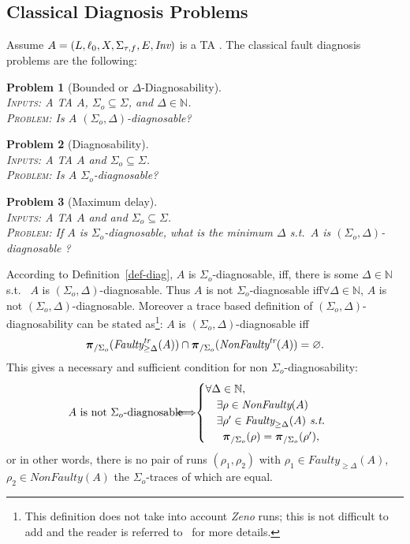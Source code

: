 \documentclass[letterpaper,10pt,conference]{ieeeconf}  \IEEEoverridecommandlockouts                              \overrideIEEEmargins
\def\st{{s.t.}~}
\def\emptyset{\varnothing}
\def\trace{\textit{tr}}
\def\faulty{\textit{Faulty}}
\def\nonfaulty{\textit{NonFaulty}}
\newtheorem{prob}{Problem}  \newtheorem{definition}{Definition}
\newcommand{\setN}{\mathbb N}
\def\ssi{iff\xspace}
\def\tauac{\tau}
\begin{document}
\subsection{Classical Diagnosis Problems}
\noindent
Assume $A=(L,\ell_0,X,\Sigma_{\tauac,f},E,\inv)$ is a TA
.  The
classical fault diagnosis problems are the following: \begin{prob}[Bounded or $\Delta$-Diagnosability] \label{prob-delta-diag} \mbox{} \\
  \textsc{Inputs:} A  TA $A$, $\Sigma_o \subseteq \Sigma$, and $\Delta \in \setN$. \\
  \textsc{Problem:} Is $A$ $(\Sigma_o,\Delta)$-diagnosable?
\end{prob}
\begin{prob}[Diagnosability] \label{prob-diag} \mbox{} \\
  \textsc{Inputs:} A TA $A$ and $\Sigma_o \subseteq \Sigma$. \\
  \textsc{Problem:} Is $A$ $\Sigma_o$-diagnosable?
\end{prob}
\begin{prob}[Maximum delay] \label{prob-delay} \mbox{} \\
  \textsc{Inputs:} A TA $A$ and and $\Sigma_o \subseteq \Sigma$. \\
  \textsc{Problem:} If $A$ is $\Sigma_o$-diagnosable, what is the
  minimum $\Delta$ \st $A$ is $(\Sigma_o,\Delta)$-diagnosable ?
\end{prob}
\smallskip



According to Definition~\ref{def-diag}, $A$
is $\Sigma_o$-diagnosable, \ssi, there is some $\Delta \in \setN$ \st
$A$ is $(\Sigma_o,\Delta)$-diagnosable. Thus $A$ is not $\Sigma_o$-diagnosable
\ssi $\forall \Delta \in \setN$, $A$ is not  $(\Sigma_o,\Delta)$-diagnosable.
Moreover a trace based definition of
$(\Sigma_o,\Delta)$-diagnosability can be stated as\footnote{This
  definition does not take into account \emph{Zeno} runs; this is not
  difficult to add and the reader is referred to~\cite{cassez-cdc-09}
  for more details.}: $A$ is $(\Sigma_o,\Delta)$-diagnosable \ssi
\begin{equation}
  \proj{\Sigma_o}(\faulty_{\geq \Delta}^{\trace}(A)) \cap
  \proj{\Sigma_o}(\nonfaulty^{\trace}(A)) = \emptyset \mathpunct. \label{eq-base}
\end{equation}
This gives a necessary and sufficient condition for non
$\Sigma_o$-diagnosability:
\begin{eqnarray}
\label{eq-diagnos2}
\hskip0em\text{$A$ is not $\Sigma_o$-diagnosable} &  \hskip-1.2em \iff  
& \hskip-1.3em 
\begin{cases}
   \forall \Delta \in \setN, \\
   \quad \exists \rho \in \nonfaulty(A) \\
   \quad \exists \rho' \in \faulty_{\geq \Delta}(A) \textit{ \st }  \\
   \quad\;\;\proj{\Sigma_o}(\rho) = \proj{\Sigma_o}(\rho') \mathpunct,
 \end{cases}
\end{eqnarray}
or in other words, there is no pair of runs $(\rho_1,\rho_2)$ with
$\rho_1 \in \faulty_{\geq \Delta}(A)$, $\rho_2 \in \nonfaulty(A)$ the
$\Sigma_o$-traces of which are equal.
\end{document}

